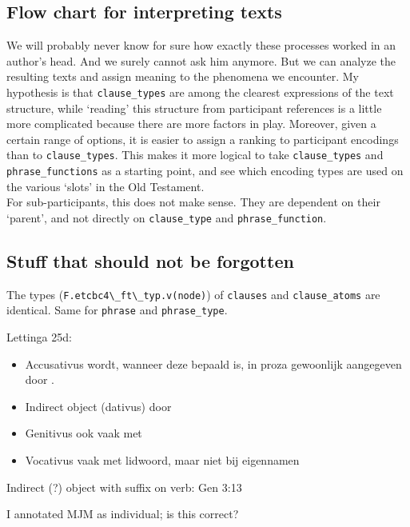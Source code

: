 \documentclass{report}
\newcommand{\mi}[1]{\lstinline{#1}}
\newcommand{\hebr}[1]{\hbox{\cjRL{#1}}}
\begin{document}
\subsection{Flow chart for interpreting texts}
We will probably never know for sure how exactly these processes worked in an author's head. And we surely cannot ask him anymore. But we can analyze the resulting texts and assign meaning to the phenomena we encounter. My hypothesis is that \mi{clause_types} are among the clearest expressions of the text structure, while `reading' this structure from participant references is a little more complicated because there are more factors in play. Moreover, given a certain range of options, it is easier to assign a ranking to participant encodings than to \mi{clause_types}. This makes it more logical to take \mi{clause_types} and \mi{phrase_functions} as a starting point, and see which encoding types are used on the various `slots' in the Old Testament.\\
For sub-participants, this does not make sense. They are dependent on their `parent', and not directly on \mi{clause_type} and \mi{phrase_function}.


\subsection{Stuff that should not be forgotten}
The types (\mi{F.etcbc4\_ft\_typ.v(node)}) of \mi{clauses} and \mi{clause_atoms} are identical. Same for \mi{phrase} and \mi{phrase_type}.

Lettinga 25d:
\begin{itemize}
\item Accusativus wordt, wanneer deze bepaald is, in proza gewoonlijk aangegeven door \hebr{>T}.
\item Indirect object (dativus) door \hebr{L}
\item Genitivus ook vaak met \hebr{L}
\item Vocativus vaak met lidwoord, maar niet bij eigennamen
\end{itemize}

Indirect (?) object with suffix on verb: Gen 3:13

I annotated MJM as individual; is this correct?

\end{document}
